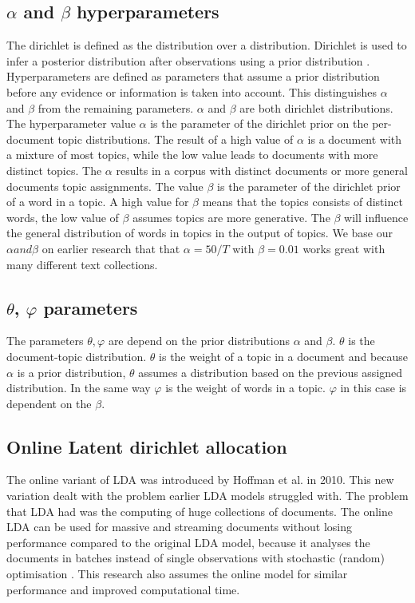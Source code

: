 \subsection{$\alpha$ and $\beta$ hyperparameters}  \label{lda:alphabeta}
The dirichlet is defined as the distribution over a distribution. Dirichlet is used to infer a posterior distribution after observations using a prior distribution \cite{Sethuraman2001APRIORS}. Hyperparameters are defined as parameters that assume a prior distribution before any evidence or information is taken into account. This distinguishes $\alpha$ and $\beta$ from the remaining parameters. $\alpha$ and $\beta$ are both dirichlet distributions. The hyperparameter value $\alpha$ is the parameter of the dirichlet prior on the per-document topic distributions. The result of a high value of $\alpha$ is a document with a mixture of most topics, while the low value leads to documents with more distinct topics. The $\alpha$ results in a corpus with distinct documents or more general documents topic assignments. The value $\beta$ is the parameter of the dirichlet prior of a word in a topic. A high value for $\beta$ means that the topics consists of distinct words, the low value of $\beta$ assumes topics are more generative. The $\beta$ will influence the general distribution of words in topics in the output of topics. We base our $\alpha and \beta$ on earlier research that that $\alpha = 50/T$ with $\beta = 0.01$ works great with many different text collections.

\subsection{$\theta$, $\varphi$ parameters}\label{lda:thetavarphi}
The parameters $\theta, \varphi$ are depend on the prior distributions $\alpha$ and $\beta$. $\theta$ is the document-topic distribution. $\theta$ is the weight of a topic in a document and because $\alpha$ is a prior distribution, $\theta$ assumes a distribution based on the previous assigned distribution. 
In the same way $\varphi$ is the weight of words in a topic. $\varphi$ in this case is dependent on the $\beta$.



\subsection{Online Latent dirichlet allocation} \label{lda:onlinelda}
The online variant of LDA was introduced  by Hoffman et al. in 2010.\cite{Hoffman2010OnlineAllocation} This new variation dealt with the problem earlier LDA models struggled with. The problem that LDA had was the computing of huge collections of documents. The online LDA can be used for massive and streaming documents without losing performance compared to the original LDA model, because it analyses the documents in batches instead of single observations with stochastic (random) optimisation \cite{Beaver2012}. This research also assumes the online model for similar performance and improved computational time.
